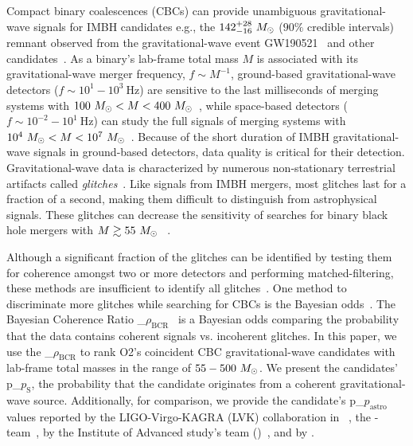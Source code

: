 \documentclass[useAMS,fleqn, usenatbib, final]{mnras}
\newcommand{\pycbc}{{\sc {{PyCBC}}}\xspace}
\newcommand{\GWTC}{{\sc {{GWTC-1}}}\xspace}
\newcommand{\IAS}{{\sc {{IAS}}}\xspace}
\newcommand{\fancytext}[1]{{\relax\ifmmode#1\else $#1$\fi}\xspace}
\newcommand{\mathcmd}[1]{{\sc \relax\ifmmode#1\else $#1$\fi}\xspace}
\newcommand{\bcr}{\mathcmd{\rho_\text{BCR}}}
\newcommand{\msun}{\mathcmd{M_\odot}}
\newcommand{\totMlab}{\mathcmd{M}}
\newcommand{\pastro}{\fancytext{p_\text{astro}}}
\newcommand{\pastrobcr}{\fancytext{p_\text{S}}}
\begin{document}
Compact binary coalescences (CBCs) can provide unambiguous gravitational-wave signals for IMBH candidates e.g., the ${142^{+28}_{-16}~\msun}$ ($90\%$ credible intervals) remnant observed from the gravitational-wave event GW190521~\citep{Abbott:2020:PhRvL} and other candidates~\citep{ligo_imbh_search, ligo_imbh_o3, pycbc_imbh}. As a binary's lab-frame total mass $M$ is associated with its gravitational-wave merger frequency, ${f\sim M^{-1}}$,  ground-based gravitational-wave detectors (${f\sim 10^1 - 10^3\ \text{Hz}}$) are sensitive to the last milliseconds of merging systems with ${100~\msun < \totMlab < 400~\msun}$~\citep{LIGOScientificCollaboration:2015:CQGra, Martynov:2016:PhRvD, Moore_2014, Acernese:2015:CQGra}, while space-based detectors (${f\sim 10^{-2}-10^1\ \text{Hz}}$) can study the full signals of merging systems with ${10^4~\msun < \totMlab < 10^7~\msun}$~\citep{ Moore_2014, Lu:2019:PhRvD}. Because of the short duration of IMBH gravitational-wave signals in ground-based detectors, data quality is critical for their detection. Gravitational-wave data is characterized by numerous non-stationary terrestrial artifacts called \textit{glitches}~\citep{ pycbc_short_duration_transients, pe_with_glitch, blip_glitches}. Like signals from IMBH mergers, most glitches last for a fraction of a second, making them difficult to distinguish from astrophysical signals. These glitches can decrease the sensitivity of searches for binary black hole mergers with ${\totMlab\gtrsim55~\msun}$ ~\citep{pycbc_short_duration_transients}.

Although a significant fraction of the glitches can be identified by testing them for coherence amongst two or more detectors and performing matched-filtering, these methods are insufficient to identify all glitches~\citep{ pycbc_short_duration_transients, pe_with_glitch, blip_glitches}. One method to discriminate more glitches while searching for CBCs is the Bayesian odds~\citep{bci, kanner2016leveraging, BCR1, BCR2, bcr_gw151216, bayesian_odds}. The Bayesian Coherence Ratio \bcr~\citep{BCR1,BCR2} is a Bayesian odds comparing the probability that the data contains coherent signals vs. incoherent glitches. In this paper, we use the \bcr to rank O2’s coincident CBC gravitational-wave candidates with lab-frame total masses in the range of ${55-500~\msun}$. We present the candidates' \pastrobcr, the probability that the candidate originates from a coherent gravitational-wave source. Additionally, for comparison, we provide the candidate's \pastro values reported by the LIGO-Virgo-KAGRA (LVK) collaboration in \GWTC~\citep{GWTC1}, the \pycbc-team~\citep{pycbc_code, pycbc_og0, pycbc_og1, pycbc_og2, pycbc_og3, pycbc_og4, pycbc_og5, pycbc_og6, pycbc_single_det, pycbc_ogc_2}, by the Institute of Advanced study's team (\IAS)~\citep{IAS0, IAS1, IAS2}, and by \citet{bayesian_odds}. 
\end{document}
